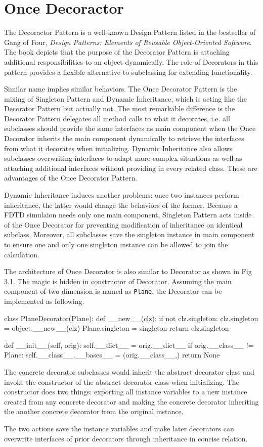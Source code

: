 \section{Once Decoractor}
The Decoractor Pattern is a well-known Design Pattern listed in the bestseller of Gang of Four, \textit{Design Patterns:
  Elements of Reusable Object-Oriented Software}. The book depicts that the purpose of the Decorator Pattern is
attaching additional responsibilities to an object dynamically. The role of Decorators in this pattern provides a
flexible alternative to subclassing for extending functionality.

Similar name implies similar behaviors. The Once Decorator Pattern is the mixing of Singleton Pattern and Dynamic
Inheritance, which is acting like the Decorator Pattern but actually not. The most remarkable difference is the
Decorator Pattern delegates all method calls to what it decorates, i.e. all subclasses should provide the same
interfaces as main component when the Once Decorator inherits the main component dynamically to retrieve the interfaces
from what it decorates when initializing. Dynamic Inheritance also allows subclasses overwriting interfaces to adapt
more complex situations as well as attaching additional interfaces without providing in every related class. These are
advantages of the Once Decorator Pattern.

Dynamic Inheritance induces another problems: once two instances perform inheritance, the latter would change the
behaviors of the former. Because a FDTD simulaion needs only one main component, Singleton Pattern acts inside of the
Once Decorator for preventing modification of inheritance on identical subclass. Moreover, all subclasses save the
singleton instance in main component to ensure one and only one singleton instance can be allowed to join the
calculation.

The architecture of Once Decorator is also similar to Decorator as shown in Fig 3.1. The magic is hidden in constructor
of Decorator. Assuming the main component of two dimension is named as \texttt{Plane}, the Decorator can be implemented
as following.
\begin{code}
  class PlaneDecorator(Plane):
    def __new__(clz):
        if not clz.singleton:
            clz.singleton = object.__new__(clz)
            Plane.singleton = singleton
        return clz.singleton

    def __init__(self, orig):
        self.__dict__ = orig.__dict__
        if orig.__class__ != Plane:
            self.__class__.__bases__ = (orig.__class__,)
        return None
\end{code}
The concrete decorator subclasses would inherit the abstract decorator class and invoke the constructor of the abstract
decorator class when initializing. The constructor does two things: exporting all instance variables to a new instance
created from any concrete decorator and making the concrete decorator inheriting the another concrete decorator from the
original instance.

The two actions save the instance variables and make later decorators can overwrite interfaces of prior decorators
through inheritance in concise relation.
